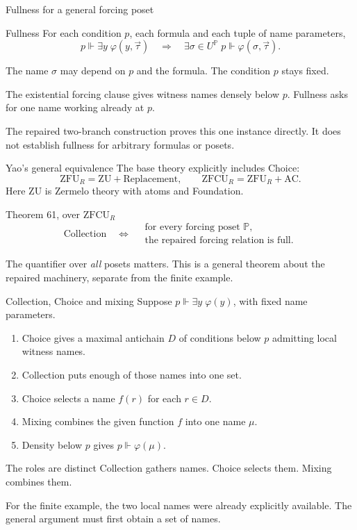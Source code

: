 \documentclass[aspectratio=169,11pt]{beamer}
\begin{document}
\begin{frame}[t]{Fullness for a general forcing poset}
\begin{block}{Fullness}
For each condition $p$, each formula and each tuple of name parameters,
\[
p\Vdash\exists y\;\varphi(y,\vec\tau)
\quad\Longrightarrow\quad
\exists\sigma\in U^{\mathbb P}\;p\Vdash\varphi(\sigma,\vec\tau).
\]
\end{block}
The name $\sigma$ may depend on $p$ and the formula. The condition $p$ stays fixed.
\medskip\par
The existential forcing clause gives witness names densely below $p$. Fullness asks for one name working already at $p$.
\medskip\par
The repaired two-branch construction proves this one instance directly. It does not establish fullness for arbitrary formulas or posets.
\end{frame}

\begin{frame}[t]{Yao's general equivalence}
The base theory explicitly includes Choice:
\[
\mathrm{ZFU}_{R}=\mathrm{ZU}+\text{Replacement},\qquad
\mathrm{ZFCU}_{R}=\mathrm{ZFU}_{R}+\mathrm{AC}.
\]
Here $\mathrm{ZU}$ is Zermelo theory with atoms and Foundation.
\begin{block}{Theorem 61, over $\mathrm{ZFCU}_{R}$}
\[
\text{Collection}\quad\Longleftrightarrow\quad
\begin{gathered}
\text{for every forcing poset }\mathbb P,\\
\text{the repaired forcing relation is full.}
\end{gathered}
\]
\end{block}
The quantifier over \emph{all} posets matters. This is a general theorem about the repaired machinery, separate from the finite example.
\end{frame}

\begin{frame}[t]{Collection, Choice and mixing}
Suppose $p\Vdash\exists y\;\varphi(y)$, with fixed name parameters.
\begin{enumerate}
\item Choice gives a maximal antichain $D$ of conditions below $p$ admitting local witness names.
\item Collection puts enough of those names into one set.
\item Choice selects a name $f(r)$ for each $r\in D$.
\item Mixing combines the given function $f$ into one name $\mu$.
\item Density below $p$ gives $p\Vdash\varphi(\mu)$.
\end{enumerate}
\begin{block}{The roles are distinct}
Collection gathers names. Choice selects them. Mixing combines them.
\end{block}
For the finite example, the two local names were already explicitly available. The general argument must first obtain a set of names.
\end{frame}
\end{document}
